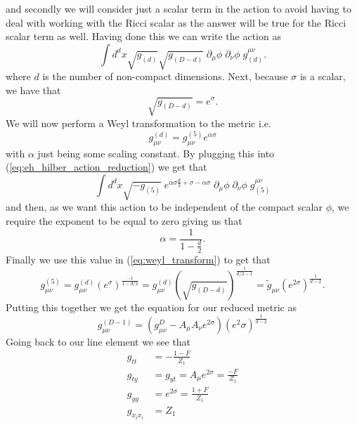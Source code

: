 \documentclass[12pt]{article}
\numberwithin{equation}{section}
\numberwithin{figure}{section}
\begin{document}
and secondly we will consider just a scalar term in the action to avoid having to deal with working with the Ricci scalar as the answer will be true for the Ricci scalar term as well. Having done this we can write the action as
\begin{equation}
	\int d^{d}x\sqrt{g_{(d)}}\sqrt{g_{(D-d)}}\;\partial_{\mu}\phi\;\partial_{\nu}\phi \;g^{\mu\nu}_{(d)}. \label{eq:eh_hilber_action_reduction}
\end{equation}
where $d$ is the number of non-compact dimensions. Next, because $\sigma$ is a scalar, we have that
\begin{equation}
	\sqrt{g_{(D-d)}}=e^{\sigma}.
\end{equation}
We will now perform a Weyl transformation to the metric i.e.
\begin{equation}
	g_{\mu\nu}^{(d)}=g_{\mu\nu}^{(5)}e^{\alpha\sigma} \label{eq:weyl_transform}
\end{equation}
with $\alpha$ just being some scaling constant. By plugging this into (\ref{eq:eh_hilber_action_reduction}) we get that 
\begin{equation}
	\int d^{d}x\sqrt{-g_{(5)}}\;e^{\alpha\sigma \frac{d}{2}+\sigma -\alpha\sigma}\;\partial_{\mu}\phi\;\partial_{\nu}\phi \;g^{\mu\nu}_{(5)}
\end{equation}
and then, as we want this action to be independent of the compact scalar $\phi$, we require the exponent to be equal to zero giving us that
\begin{equation}
	\alpha=\frac{1}{1- \frac{d}{2}}.
\end{equation}
Finally we use this value in (\ref{eq:weyl_transform}) to get that
\begin{equation}
	g_{\mu\nu}^{(5)}=g_{\mu\nu}^{(d)}(e^{\sigma})^{\frac{-1}{1-d/2}}=
	g_{\mu\nu}^{(d)}(\sqrt{g_{(D-d)}})^{\frac{1}{d/2-1}}=\tilde{g}_{\mu\nu}(e^{2\sigma})^{\frac{1}{d-2}}.
\end{equation}
Putting this together we get the equation for our reduced metric as
\begin{equation}
	g_{\mu\nu}^{(D-1)}=\left(g_{\mu\nu}^{D}-A_{\mu}A_{\nu}e^{2\sigma}\right)(e^2{\sigma})^{\frac{1}{d-2}}
\end{equation}
Going back to our line element we see that
\begin{align}
	g_{tt}&= -\frac{1-F}{Z_{1}}\\
	g_{ty}&=g_{yt}=A_{\mu}e^{2\sigma}=\frac{-F}{Z_{1}}\\
	g_{yy}&=e^{2\sigma}=\frac{1+F}{Z_{1}}\\
	g_{x_{i}x_{i}}&=Z_{1}
\end{align}
\end{document}
